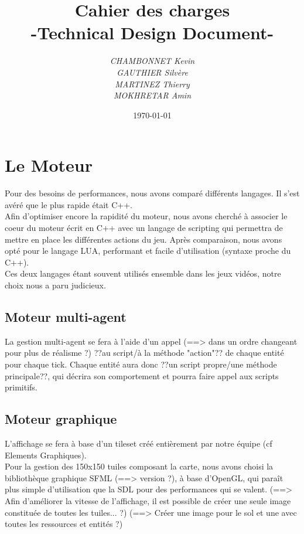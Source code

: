 \documentclass[a4paper]{article}
\title{Cahier des charges\\-Technical Design Document-}
\author{\emph{CHAMBONNET Kevin}\\\emph{GAUTHIER Silvère}\\\emph{MARTINEZ Thierry}\\\emph{MOKHRETAR Amin}}
\date{\today}
\begin{document}
\maketitle

\section*{Le Moteur}
Pour des besoins de performances, nous avons comparé différents langages. Il s'est avéré que le plus rapide était C++.\\
Afin d'optimiser encore la rapidité du moteur, nous avons cherché à associer le coeur du moteur écrit en C++ avec un langage de scripting qui permettra de mettre en place les différentes actions du jeu. Après comparaison, nous avons opté pour le langage LUA, performant et facile d'utilisation (syntaxe proche du C++).\\
Ces deux langages étant souvent utilisés ensemble dans les jeux vidéos, notre choix nous a paru judicieux.

\subsection*{Moteur multi-agent}
La gestion multi-agent se fera à l'aide d'un appel (==> dans un ordre changeant pour plus de réalisme ?) ??au script/à la méthode "action"?? de chaque entité pour chaque tick. Chaque entité aura donc ??un script propre/une méthode principale??, qui décrira son comportement et pourra faire appel aux scripts primitifs.

\subsection*{Moteur graphique}
L'affichage se fera à base d'un tileset créé entièrement par notre équipe (cf Elements Graphiques).\\
Pour la gestion des 150x150 tuiles composant la carte, nous avons choisi la bibliothèque graphique SFML (==> version ?), à base d'OpenGL, qui paraît plus simple d'utilisation que la SDL pour des performances qui se valent.
(==> Afin d'améliorer la vitesse de l'affichage, il est possible de créer une seule image constituée de toutes les tuiles... ?)
(==> Créer une image pour le sol et une avec toutes les ressources et entités ?)
\end{document}
